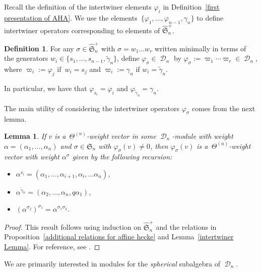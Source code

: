 \documentclass[10pt,a4paper]{amsart}
\numberwithin{equation}{section}
\newtheorem{Lemma}[Theorem]{Lemma}
\theoremstyle{definition}
\newtheorem{Definition}[Theorem]{Definition}
\DeclareMathOperator{\sD}{\mathscr{D}}
\begin{document}
Recall the definition of the intertwiner elements $\varphi_i$ in Definition~\ref{first presentation of AHA}. We use the elements~${\{\varphi_1,\dots, \varphi_{n-1}, \gamma_n\}}$ to define intertwiner operators corresponding to elements of $\widehat{\mathfrak{S}}_n^{+}$.

\begin{Definition}\label{intertwiners def}
 For any $\sigma \in \widehat{\mathfrak{S}}_n^{+}$ with $
 \sigma = w_1\dots w_r$ written minimally in terms of the generators $w_i \in \{s_1,\dots, s_{n-1},\widetilde{\gamma}_n \}$, define $\varphi_{\sigma} \in \sD_n$ by
$ \varphi_{\sigma}:= \varpi_1\cdots \varpi_r \in \sD_n
$, where $\varpi_i:= \varphi_j$ if~${w_i = s_j}$ and $\varpi_{i} := \gamma_n$ if $w_i = \widetilde{\gamma}_n$.

In particular, we have that $\varphi_{s_i} = \varphi_{i}$ and $\varphi_{\widetilde{\gamma}_n} = \gamma_n$.
\end{Definition}

The main utility of considering the intertwiner operators $\varphi_{\sigma}$ comes from the next lemma.

\begin{Lemma}\label{weight vector intertwiners Lemma}
 If $v$ is a~$\Theta^{(n)}$-weight vector in some $\sD_n$-module with weight $\alpha= (\alpha_1,\dots,\alpha_n)$ and $\sigma \in \mathfrak{S}_n$ with $\varphi_{\sigma}(v) \neq 0$, then $\varphi_{\sigma}(v)$ is a~$\Theta^{(n)}$-weight vector with weight $\alpha^{\sigma}$ given by the following recursion:
 \begin{itemize}
\itemsep=0pt
 \item $\alpha^{s_i} = (\alpha_1,\dots,\alpha_{i+1},\alpha_i,\dots\alpha_n)$,
 \item $\alpha^{\widetilde{\gamma}_n} = (\alpha_2,\dots, \alpha_{n}, q\alpha_1)$,
 \item $(\alpha^{\sigma_2})^{\sigma_1} = \alpha^{\sigma_1\sigma_2}$.
 \end{itemize}
\end{Lemma}
\begin{proof}
 This result follows using induction on $\widehat{\mathfrak{S}}_n^{+}$ and the relations in Proposition~\ref{additional relations for affine hecke} and Lemma~\ref{intertwiner Lemma}. For reference, see \cite[Section~3.3.3]{CherednikBook}.
\end{proof}

We are primarily interested in modules for the \textit{spherical} subalgebra of $\sD_n$.
\end{document}
